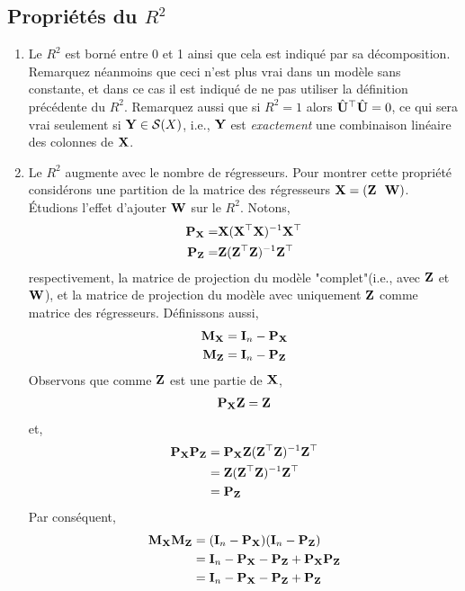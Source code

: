 \subsection{Propriétés du $R^2$}
\begin{enumerate}
\item Le $R^2$ est borné entre 0 et 1 ainsi que cela est indiqué par sa décomposition. Remarquez néanmoins que ceci n'est plus vrai dans un modèle sans constante, et dans ce cas il est indiqué de ne pas utiliser la définition précédente du $R^2$. Remarquez aussi que si $R^2 =  1$ alors $\hat{\mathbf U}^\top\hat{\mathbf U} = 0$, ce qui sera vrai seulement si $\mathbf Y\in \mathcal{S}(X)$, i.e., $\mathbf Y$ est \emph{exactement} une combinaison linéaire des colonnes de $\mathbf X$.
\item Le $R^2$ augmente avec le nombre de régresseurs. Pour montrer cette propriété considérons une partition de la matrice des régresseurs $\mathbf X = (\mathbf Z \ \ \mathbf W)$. \'Etudions l'effet d'ajouter $\mathbf W$ sur le $R^2$. Notons,
\begin{align*}
\mathbf P_\mathbf X = &\mathbf X(\mathbf X^\top\mathbf X)^{-1}\mathbf X^\top\\
\mathbf P_\mathbf Z = &\mathbf Z(\mathbf Z^\top\mathbf Z)^{-1}\mathbf Z^\top
\end{align*}
respectivement, la matrice de projection du modèle "complet"(i.e., avec $\mathbf Z$ et $\mathbf W$), et la matrice de projection du modèle avec uniquement $\mathbf Z$ comme matrice des régresseurs. Définissons aussi,
\begin{align*}
\mathbf M_\mathbf X  &= \mathbf{I}_n - \mathbf P_\mathbf X\\
\mathbf M_\mathbf Z &= \mathbf{I}_n - \mathbf P_\mathbf Z
\end{align*}
Observons que comme $\mathbf Z$ est une partie de $\mathbf X$,
\begin{align*}
\mathbf P_\mathbf X  \mathbf Z = \mathbf Z
\end{align*}
et,
\begin{align*}
\mathbf P_\mathbf X\mathbf P_\mathbf Z &= \mathbf P_\mathbf X \mathbf Z(\mathbf Z^\top\mathbf Z)^{-1}\mathbf Z^\top\\
& = \mathbf Z(\mathbf Z^\top\mathbf Z)^{-1}\mathbf Z^\top \\
&= \mathbf P_\mathbf Z
\end{align*}
Par conséquent,
\begin{align*}
\boldM_\boldX\boldM_\boldZ& = (\Id_n - \boldP_\boldX)(\Id_n - \boldP_\boldZ)\\
&=\Id_n - \boldP_\boldX - \boldP_\boldZ + \boldP_\boldX\boldP_\boldZ\\
&=\Id_n - \boldP_\boldX - \boldP_\boldZ +  \boldP_\boldZ\\

\end{align*}
\end{enumerate}
